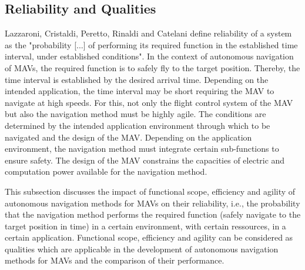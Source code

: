 \subsection{Reliability and Qualities}

Lazzaroni, Cristaldi, Peretto, Rinaldi and Catelani \cite{Lazzaroni2011}
define reliability of a system as the "probability [...] of performing its required function 
in the established time interval, under established conditions".
In the context of autonomous navigation of MAVs,
the required function is to safely fly to the target position.
Thereby, the time interval is established by the desired arrival time.
Depending on the intended application, the time interval may be short requiring the MAV to navigate at high speeds.
For this, not only the flight control system of the MAV but also the navigation method must be highly agile.
The conditions are determined by the intended application environment through which to be navigated and the design of the MAV.
Depending on the application environment, the navigation method must integrate certain sub-functions to ensure safety.
The design of the MAV constrains the capacities of electric and computation power available for the navigation method.

This subsection discusses the impact of functional scope, efficiency and agility
of autonomous navigation methods for MAVs on their reliability, 
i.e., the probability that the navigation method performs 
the required function (safely navigate to the target position in time)
in a certain environment, with certain ressources, in a certain application.
Functional scope, efficiency and agility can be considered as qualities
which are applicable in the development of autonomous navigation methods for MAVs and the comparison of their performance.


